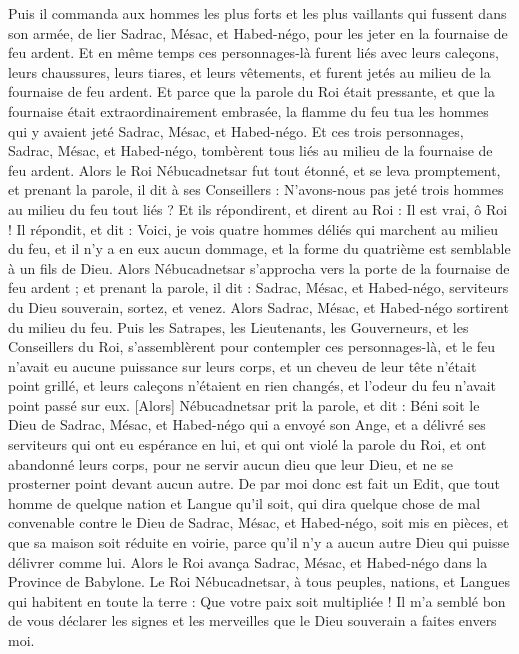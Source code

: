 \begin{multicols}{2}
Puis il commanda aux hommes les plus forts et les plus vaillants qui fussent dans son armée, de lier Sadrac, Mésac, et Habed-négo, pour les jeter en la fournaise de feu ardent.
Et en même temps ces personnages-là furent liés avec leurs caleçons, leurs chaussures, leurs tiares, et leurs vêtements, et furent jetés au milieu de la fournaise de feu ardent.
Et parce que la parole du Roi était pressante, et que la fournaise était extraordinairement embrasée, la flamme du feu tua les hommes qui y avaient jeté Sadrac, Mésac, et Habed-négo.
Et ces trois personnages, Sadrac, Mésac, et Habed-négo, tombèrent tous liés au milieu de la fournaise de feu ardent.
Alors le Roi Nébucadnetsar fut tout étonné, et se leva promptement, et prenant la parole, il dit à ses Conseillers : N'avons-nous pas jeté trois hommes au milieu du feu tout liés ? Et ils répondirent, et dirent au Roi : Il est vrai, ô Roi !
Il répondit, et dit : Voici, je vois quatre hommes déliés qui marchent au milieu du feu, et il n'y a en eux aucun dommage, et la forme du quatrième est semblable à un fils de Dieu.
Alors Nébucadnetsar s'approcha vers la porte de la fournaise de feu ardent ; et prenant la parole, il dit : Sadrac, Mésac, et Habed-négo, serviteurs du Dieu souverain, sortez, et venez. Alors Sadrac, Mésac, et Habed-négo sortirent du milieu du feu.
Puis les Satrapes, les Lieutenants, les Gouverneurs, et les Conseillers du Roi, s'assemblèrent pour contempler ces personnages-là, et le feu n'avait eu aucune puissance sur leurs corps, et un cheveu de leur tête n'était point grillé, et leurs caleçons n'étaient en rien changés, et l'odeur du feu n'avait point passé sur eux.
[Alors] Nébucadnetsar prit la parole, et dit : Béni soit le Dieu de Sadrac, Mésac, et Habed-négo qui a envoyé son Ange, et a délivré ses serviteurs qui ont eu espérance en lui, et qui ont violé la parole du Roi, et ont abandonné leurs corps, pour ne servir aucun dieu que leur Dieu, et ne se prosterner point devant aucun autre.
De par moi donc est fait un Edit, que tout homme de quelque nation et Langue qu'il soit, qui dira quelque chose de mal convenable contre le Dieu de Sadrac, Mésac, et Habed-négo, soit mis en pièces, et que sa maison soit réduite en voirie, parce qu'il n'y a aucun autre Dieu qui puisse délivrer comme lui.
Alors le Roi avança Sadrac, Mésac, et Habed-négo dans la Province de Babylone.
\VerseOne{}Le Roi Nébucadnetsar, à tous peuples, nations, et Langues qui habitent en toute la terre : Que votre paix soit multipliée !
Il m'a semblé bon de vous déclarer les signes et les merveilles que le Dieu souverain a faites envers moi.

\end{multicols}
